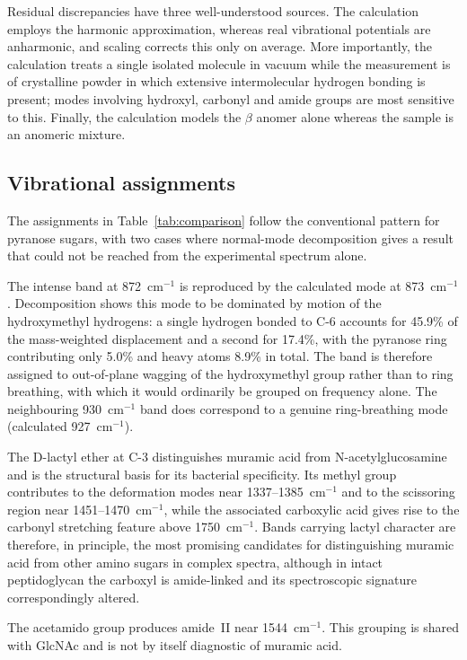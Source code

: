 \documentclass[11pt,a4paper]{article}
\newcommand{\wn}{\ensuremath{\mathrm{cm}^{-1}}}
\begin{document}
Residual discrepancies have three well-understood sources. The calculation
employs the harmonic approximation, whereas real vibrational potentials are
anharmonic, and scaling corrects this only on average. More importantly, the
calculation treats a single isolated molecule in vacuum while the measurement is
of crystalline powder in which extensive intermolecular hydrogen bonding is
present; modes involving hydroxyl, carbonyl and amide groups are most sensitive
to this. Finally, the calculation models the $\beta$ anomer alone whereas the
sample is an anomeric mixture.

\subsection{Vibrational assignments}

The assignments in Table~\ref{tab:comparison} follow the conventional pattern
for pyranose sugars, with two cases where normal-mode decomposition gives a
result that could not be reached from the experimental spectrum alone.

The intense band at 872~\wn{} is reproduced by the calculated mode at
873~\wn{}. Decomposition shows this mode to be dominated by motion of the
hydroxymethyl hydrogens: a single hydrogen bonded to C-6 accounts for 45.9\% of
the mass-weighted displacement and a second for 17.4\%, with the pyranose ring
contributing only 5.0\% and heavy atoms 8.9\% in total. The band is therefore
assigned to out-of-plane wagging of the hydroxymethyl group rather than to ring
breathing, with which it would ordinarily be grouped on frequency alone. The
neighbouring 930~\wn{} band does correspond to a genuine ring-breathing mode
(calculated 927~\wn{}).

The D-lactyl ether at C-3 distinguishes muramic acid from N-acetylglucosamine
and is the structural basis for its bacterial specificity. Its methyl group
contributes to the deformation modes near 1337--1385~\wn{} and to the scissoring
region near 1451--1470~\wn{}, while the associated carboxylic acid gives rise to
the carbonyl stretching feature above 1750~\wn{}. Bands carrying lactyl
character are therefore, in principle, the most promising candidates for
distinguishing muramic acid from other amino sugars in complex spectra, although
in intact peptidoglycan the carboxyl is amide-linked and its spectroscopic
signature correspondingly altered.

The acetamido group produces amide~II near 1544~\wn{}. This grouping is shared
with GlcNAc and is not by itself diagnostic of muramic acid.
\end{document}
